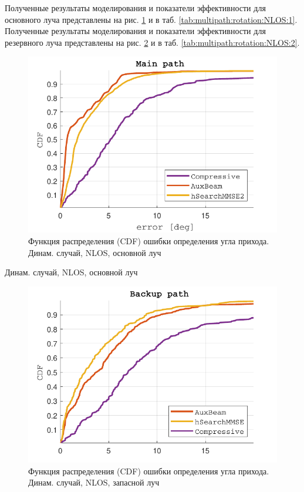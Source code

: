 Полученные результаты моделирования и показатели эффективности для основного луча представлены на
рис. \ref{fig:multipath:rotation:NLOS:1} и в таб. \ref{tab:multipath:rotation:NLOS:1}. 
Полученные результаты моделирования и показатели эффективности для резервного
луча представлены на рис. \ref{fig:multipath:rotation:NLOS:2} и в таб. \ref{tab:multipath:rotation:NLOS:2}.
\begin{figure}[H]
  \centering
  \includegraphics{results/rus/multipath-rotation-NLOS-1}
  \caption{Функция распределения (CDF) ошибки определения угла прихода. Динам. случай, NLOS, основной луч}
  \label{fig:multipath:rotation:NLOS:1}
\end{figure}

\begin{table}[H]
  \begin{center}
    \caption{Динам. случай, NLOS, основной луч}
    \label{tab:multipath:rotation:NLOS:1}
  \end{center}
\end{table}

\begin{figure}[H]
  \centering
  \includegraphics{results/rus/multipath-rotation-NLOS-2}
  \caption{Функция распределения (CDF) ошибки определения угла прихода. Динам. случай, NLOS, запасной луч}
  \label{fig:multipath:rotation:NLOS:2}
\end{figure}


